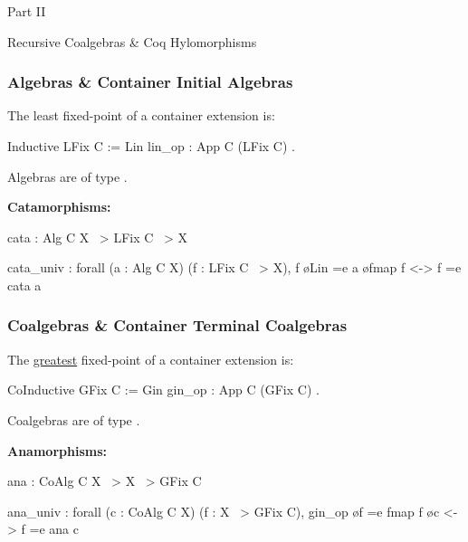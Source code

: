 \begin{frame}
  \vfill
  \centering
  \begin{sticky}
    {\normalfont Part II}

    {\normalfont\Large Recursive Coalgebras \& Coq Hylomorphisms}
    \par%
  \end{sticky}
  \vfill
\end{frame}

\begin{frame}[fragile]
  \frametitle{Algebras \& Container Initial Algebras}

  The least fixed-point of a container extension  is:
  \begin{coqcode}
    Inductive LFix C := Lin { lin_op : App C (LFix C) }.
  \end{coqcode}
  \vspace{.4cm}

  Algebras are of type .
  \vspace{.4cm}

  \textbf{Catamorphisms:}
  \begin{coqcode}
cata : Alg C X ~> LFix C ~> X

cata_univ : forall (a : Alg C X) (f : LFix C ~> X),
  f \o Lin =e a \o fmap f <-> f =e cata a
  \end{coqcode}
\end{frame}

\begin{frame}[fragile]
  \frametitle{Coalgebras \& Container Terminal Coalgebras}

  The \ul{greatest} fixed-point of a container extension  is:
  \begin{coqcode}
    CoInductive GFix C := Gin { gin_op : App C (GFix C) }.
  \end{coqcode}
  \vspace{.4cm}

  Coalgebras are of type .
  \vspace{.4cm}

  \textbf{Anamorphisms:}
  \begin{coqcode}
ana : CoAlg C X ~> X ~> GFix C

ana_univ : forall (c : CoAlg C X) (f : X ~> GFix C),
  gin_op \o f =e fmap f \o c <-> f =e ana c
  \end{coqcode}
\end{frame}

